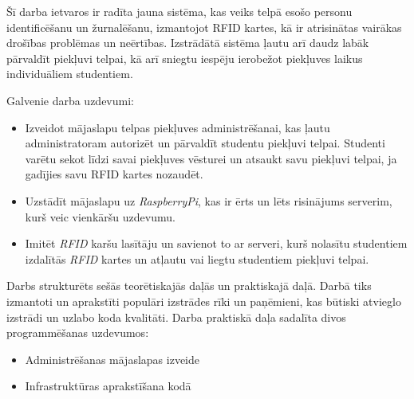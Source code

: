 Šī darba ietvaros ir radīta jauna sistēma, kas veiks telpā esošo personu identificēšanu un žurnalēšanu, izmantojot RFID kartes, kā ir atrisinātas vairākas drošības problēmas un neērtības. Izstrādātā sistēma ļautu arī daudz labāk pārvaldīt piekļuvi telpai, kā arī sniegtu iespēju ierobežot piekļuves laikus individuāliem studentiem.

Galvenie darba uzdevumi:
\begin{itemize}
  \item Izveidot mājaslapu telpas piekļuves administrēšanai, kas ļautu administratoram autorizēt un pārvaldīt studentu piekļuvi telpai. Studenti varētu sekot līdzi savai piekļuves vēsturei un atsaukt savu piekļuvi telpai, ja gadījies savu RFID kartes nozaudēt.
  \item Uzstādīt mājaslapu uz \textit{RaspberryPi}, kas ir ērts un lēts risinājums serverim, kurš veic vienkāršu uzdevumu.
  \item Imitēt \textit{RFID} karšu lasītāju un savienot to ar serveri, kurš nolasītu studentiem izdalītās \textit{RFID} kartes un atļautu vai liegtu studentiem piekļuvi telpai.
\end{itemize}

Darbs strukturēts sešās teorētiskajās daļās un praktiskajā daļā.
Darbā tiks izmantoti un aprakstīti populāri izstrādes rīki un paņēmieni, kas būtiski atvieglo izstrādi un uzlabo koda kvalitāti.
Darba praktiskā daļa sadalīta divos programmēšanas uzdevumos:
\begin{itemize}
  \item Administrēšanas mājaslapas izveide
  \item Infrastruktūras aprakstīšana kodā
\end{itemize}


